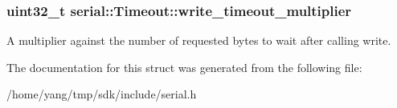 \subsubsection[{\texorpdfstring{write\+\_\+timeout\+\_\+multiplier}{write_timeout_multiplier}}]{\setlength{\rightskip}{0pt plus 5cm}uint32\+\_\+t serial\+::\+Timeout\+::write\+\_\+timeout\+\_\+multiplier}\hypertarget{structserial_1_1_timeout_a31ddae32907cff9c3d27fa763981317d}{}\label{structserial_1_1_timeout_a31ddae32907cff9c3d27fa763981317d}
A multiplier against the number of requested bytes to wait after calling write. 

The documentation for this struct was generated from the following file\+:\begin{DoxyCompactItemize}
\item 
/home/yang/tmp/sdk/include/serial.\+h\end{DoxyCompactItemize}
